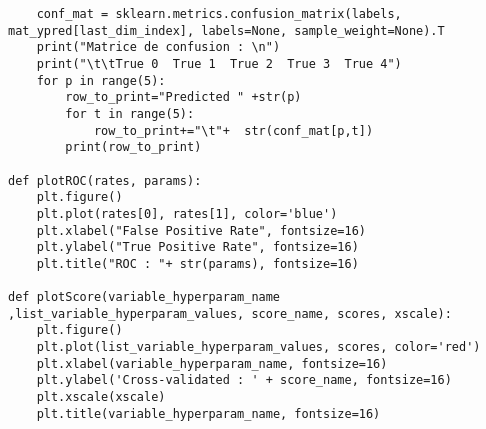 \documentclass{article}
\begin{document}
\begin{lstlisting}
    conf_mat = sklearn.metrics.confusion_matrix(labels,  mat_ypred[last_dim_index], labels=None, sample_weight=None).T
    print("Matrice de confusion : \n")
    print("\t\tTrue 0  True 1  True 2  True 3  True 4")
    for p in range(5):
        row_to_print="Predicted " +str(p)
        for t in range(5):
            row_to_print+="\t"+  str(conf_mat[p,t])
        print(row_to_print)
        
def plotROC(rates, params):
    plt.figure()
    plt.plot(rates[0], rates[1], color='blue')
    plt.xlabel("False Positive Rate", fontsize=16)
    plt.ylabel("True Positive Rate", fontsize=16)
    plt.title("ROC : "+ str(params), fontsize=16)

def plotScore(variable_hyperparam_name ,list_variable_hyperparam_values, score_name, scores, xscale):
    plt.figure()
    plt.plot(list_variable_hyperparam_values, scores, color='red')
    plt.xlabel(variable_hyperparam_name, fontsize=16)
    plt.ylabel('Cross-validated : ' + score_name, fontsize=16)
    plt.xscale(xscale)
    plt.title(variable_hyperparam_name, fontsize=16)

\end{lstlisting}
\end{document}
